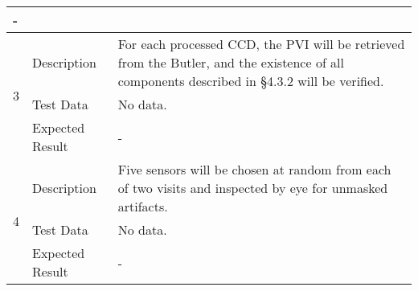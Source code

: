 \begin{longtable}[]{p{1.3cm}p{2cm}p{13cm}}
\begin{minipage}[t]{13cm}{\footnotesize
-
\vspace{\dp0}
} \end{minipage} 


\\ \midrule



\multirow{3}{*}{ 3 } & Description &
\begin{minipage}[t]{13cm}{\footnotesize
For each processed CCD, the PVI will be retrieved from the Butler, and
the existence of all components described in §4.3.2 will be verified.
 
\vspace{\dp0}
} \end{minipage} \\ \cline{2-3}
& Test Data & 
\begin{minipage}[t]{13cm}{\footnotesize

No data. 
\vspace{\dp0}

} \end{minipage} \\ \cline{2-3}
& Expected Result &

\begin{minipage}[t]{13cm}{\footnotesize
-
\vspace{\dp0}
} \end{minipage} 


\\ \midrule



\multirow{3}{*}{ 4 } & Description &
\begin{minipage}[t]{13cm}{\footnotesize
Five sensors will be chosen at random from each of two visits and
inspected by eye for unmasked artifacts.
 
\vspace{\dp0}
} \end{minipage} \\ \cline{2-3}
& Test Data & 
\begin{minipage}[t]{13cm}{\footnotesize

No data. 
\vspace{\dp0}

} \end{minipage} \\ \cline{2-3}
& Expected Result &

\begin{minipage}[t]{13cm}{\footnotesize
-
\vspace{\dp0}
} \end{minipage} 


\\ \midrule

\end{longtable}




